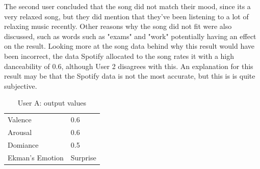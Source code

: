 The second user concluded that the song did not match their mood, since its a very relaxed song, but they did mention that they've been listening to a lot of relaxing music recently. Other reasons why the song did not fit were also discussed, such as words such as "exams" and "work" potentially having an effect on the result. Looking more at the song data behind why this result would have been incorrect, the data Spotify allocated to the song rates it with a high danceability of 0.6, although User 2 disagrees with this. An explanation for this result may be that the Spotify data is not the most accurate, but this is is quite subjective.

\begin{table}[h]
\centering
\caption{User A: output values}
\begin{tabular}{|l|l|}
\hline
 Valence &  0.6\\
 Arousal &  0.6\\
 Domiance &  0.5\\
 Ekman's Emotion &  Surprise\\ \hline
\end{tabular}
\label{user:2values}
\end{table}
